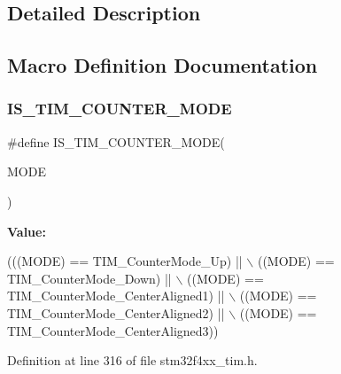 \subsection{Detailed Description}


\subsection{Macro Definition Documentation}
\mbox{\label{group___t_i_m___counter___mode_ga9543fec190793e800d5d1b1b853636f5}} 
\subsubsection{\texorpdfstring{I\+S\+\_\+\+T\+I\+M\+\_\+\+C\+O\+U\+N\+T\+E\+R\+\_\+\+M\+O\+DE}{IS\_TIM\_COUNTER\_MODE}}
{\footnotesize\ttfamily \#define I\+S\+\_\+\+T\+I\+M\+\_\+\+C\+O\+U\+N\+T\+E\+R\+\_\+\+M\+O\+DE(\begin{DoxyParamCaption}\item[{}]{M\+O\+DE }\end{DoxyParamCaption})}

{\bfseries Value\+:}
\begin{DoxyCode}
(((MODE) == TIM\_CounterMode\_Up) ||  \(\backslash\)
                                   ((MODE) == TIM\_CounterMode\_Down) || \(\backslash\)
                                   ((MODE) == TIM\_CounterMode\_CenterAligned1) || \(\backslash\)
                                   ((MODE) == TIM\_CounterMode\_CenterAligned2) || \(\backslash\)
                                   ((MODE) == TIM\_CounterMode\_CenterAligned3))
\end{DoxyCode}


Definition at line 316 of file stm32f4xx\+\_\+tim.\+h.

